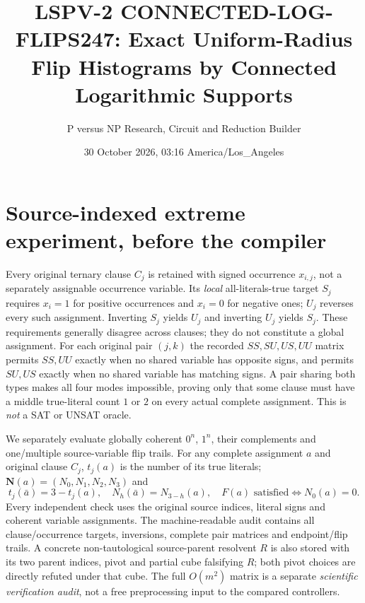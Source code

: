 \documentclass[11pt]{article}
\title{LSPV-2 CONNECTED-LOG-FLIPS247: Exact Uniform-Radius Flip Histograms by Connected Logarithmic Supports}
\author{P versus NP Research, Circuit and Reduction Builder}
\date{30 October 2026, 03:16 America/Los\_Angeles}
\newcommand{\vv}[1]{\boldsymbol{#1}}
\begin{document}
\maketitle
\noindent{}

\section{Source-indexed extreme experiment, before the compiler}
Every original ternary clause $C_j$ is retained with signed occurrence $x_{i,j}$, not a separately assignable occurrence variable. Its \emph{local} all-literals-true target $S_j$ requires $x_i=1$ for positive occurrences and $x_i=0$ for negative ones; $U_j$ reverses every such assignment. Inverting $S_j$ yields $U_j$ and inverting $U_j$ yields $S_j$. These requirements generally disagree across clauses; they do not constitute a global assignment. For each original pair $(j,k)$ the recorded $SS,SU,US,UU$ matrix permits $SS,UU$ exactly when no shared variable has opposite signs, and permits $SU,US$ exactly when no shared variable has matching signs. A pair sharing both types makes all four modes impossible, proving only that some clause must have a middle true-literal count $1$ or $2$ on every actual complete assignment. This is \emph{not} a SAT or UNSAT oracle.

We separately evaluate globally coherent $0^n$, $1^n$, their complements and one/multiple source-variable flip trails. For any complete assignment $a$ and original clause $C_j$, $t_j(a)$ is the number of its true literals; $\vv N(a)=(N_0,N_1,N_2,N_3)$ and
\[t_j(\bar a)=3-t_j(a),\quad N_h(\bar a)=N_{3-h}(a),\quad F(a)\text{ satisfied}\iff N_0(a)=0.\]
Every independent check uses the original source indices, literal signs and coherent variable assignments. The machine-readable audit contains all clause/occurrence targets, inversions, complete pair matrices and endpoint/flip trails. A concrete non-tautological source-parent resolvent $R$ is also stored with its two parent indices, pivot and partial cube falsifying $R$; both pivot choices are directly refuted under that cube. The full $O(m^2)$ matrix is a separate \emph{scientific verification audit}, not a free preprocessing input to the compared controllers.
\end{document}
